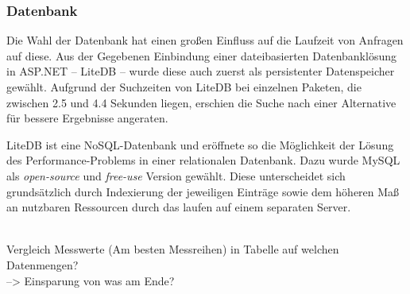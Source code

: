 \subsubsection{Datenbank} \label{sec:ExperimenteDB}
Die Wahl der Datenbank hat einen großen Einfluss auf die Laufzeit von Anfragen auf diese.
Aus der Gegebenen Einbindung einer dateibasierten Datenbanklösung in ASP.NET -- LiteDB -- wurde diese auch zuerst als persistenter Datenspeicher gewählt.
Aufgrund der Suchzeiten von LiteDB bei einzelnen Paketen, die zwischen 2.5 und 4.4 Sekunden liegen, erschien die Suche nach einer Alternative für bessere Ergebnisse angeraten.

LiteDB ist eine NoSQL-Datenbank und eröffnete so die Möglichkeit der Lösung des Performance-Problems in einer relationalen Datenbank.
Dazu wurde MySQL als \textit{open-source} und \textit{free-use} Version gewählt.
Diese unterscheidet sich grundsätzlich durch Indexierung der jeweiligen Einträge sowie dem höheren Maß an nutzbaren Ressourcen durch das laufen auf einem separaten Server.

\\

Vergleich Messwerte (Am besten Messreihen) in Tabelle auf welchen Datenmengen? \\

--> Einsparung von was am Ende? \\
